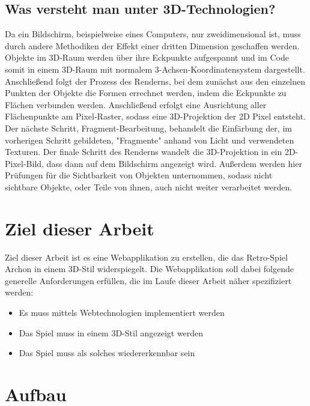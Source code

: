 \subsection{Was versteht man unter 3D-Technologien?}
Da ein Bildschirm, beispielweise eines Computers, nur zweidimensional ist, muss durch andere Methodiken der Effekt einer dritten Dimension geschaffen werden.\\Objekte im 3D-Raum werden über ihre Eckpunkte aufgespannt und im Code somit in einem 3D-Raum mit normalem 3-Achsen-Koordinatensystem dargestellt. Anschließend folgt der Prozess des Renderns, bei dem zunächst aus den einzelnen Punkten der Objekte die Formen errechnet werden, indem die Eckpunkte zu Flächen verbunden werden. Anschließend erfolgt eine Ausrichtung aller Flächenpunkte am Pixel-Raster, sodass eine 3D-Projektion der 2D Pixel entsteht. Der nächste Schritt, Fragment-Bearbeitung, behandelt die Einfärbung der, im vorherigen Schritt gebildeten, "Fragmente" anhand von Licht und verwendeten Texturen. Der finale Schritt des Renderns wandelt die 3D-Projektion in ein 2D-Pixel-Bild, dass dann auf dem Bildschirm angezeigt wird. Außerdem werden hier Prüfungen für die Sichtbarkeit von Objekten unternommen, sodass nicht sichtbare Objekte, oder Teile von ihnen, auch nicht weiter verarbeitet werden.

\section{Ziel dieser Arbeit}
\label{sec:ziel_dieser_arbeit}

Ziel dieser Arbeit ist es eine Webapplikation zu erstellen, die das Retro-Spiel Archon in einem 3D-Stil widerspiegelt.
Die Webapplikation soll dabei folgende generelle Anforderungen erfüllen, die im Laufe dieser Arbeit näher spezifiziert werden:
\begin{itemize}
	\item Es muss mittels Webtechnologien implementiert werden
	\item Das Spiel muss in einem 3D-Stil angezeigt werden
	\item Das Spiel muss als solches wiedererkennbar sein
\end{itemize}

\section{Aufbau}
\label{sec:aufbau}

